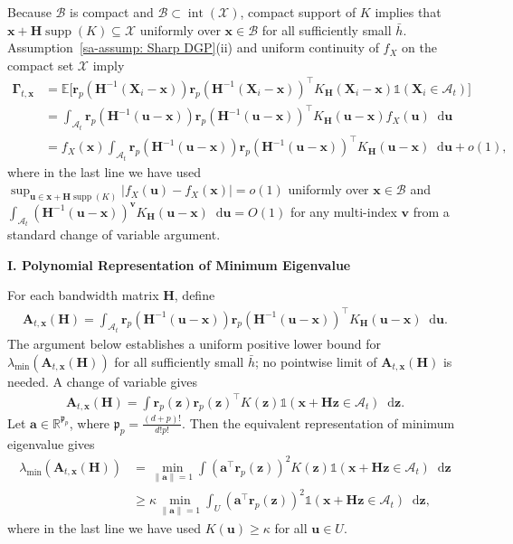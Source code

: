 \documentclass[10pt]{article}
\DeclareMathOperator{\setint}{int}
\DeclareMathOperator{\supp}{supp}
\newcommand{\E}{\mathbb{E}}
\newcommand{\Indicator}{\mathds{1}}
\newcommand{\reals}{\mathbb{R}}
\newcommand{\dif}{\mathop{}\!\mathrm{d}}
\newcommand{\norm}[1]{\left\lVert#1\right\rVert}
\newcommand{\ba}{\mathbf{a}}
\newcommand{\bA}{\mathbf{A}}
\newcommand{\bH}{\mathbf{H}}
\newcommand{\br}{\mathbf{r}}
\newcommand{\bu}{\mathbf{u}}
\newcommand{\bv}{\mathbf{v}}
\newcommand{\bx}{\mathbf{x}}
\newcommand{\bX}{\mathbf{X}}
\newcommand{\bz}{\mathbf{z}}
\newcommand{\bGamma}{\boldsymbol{\Gamma}}
\newcommand{\A}{\mathcal{A}}
\newcommand{\B}{\mathcal{B}}
\newcommand{\X}{\mathcal{X}}
\begin{document}
Because $\B$ is compact and $\B\subset\setint(\X)$, compact support of $K$ implies that $\bx+\bH\supp(K)\subseteq\X$ uniformly over $\bx\in\B$ for all sufficiently small $\bar h$. Assumption~\ref{sa-assump: Sharp DGP}(ii) and uniform continuity of $f_X$ on the compact set $\X$ imply
\begin{align*}
    \bGamma_{t,\bx} & = \E \Big[\br_p(\bH^{-1}(\bX_i-\bx)) \br_p(\bH^{-1}(\bX_i-\bx))^{\top} K_{\bH}(\bX_i - \bx) \Indicator(\bX_i \in \A_t) \Big] \\
    & = \int_{\A_t} \br_p(\bH^{-1}(\bu - \bx)) \br_p(\bH^{-1}(\bu - \bx))^{\top} K_{\bH}(\bu - \bx) f_X(\bu) \dif \bu \\
    & = f_X(\bx)\int_{\A_t} \br_p(\bH^{-1}(\bu - \bx)) \br_p(\bH^{-1}(\bu - \bx))^{\top} K_{\bH}(\bu - \bx) \dif \bu + o(1),
\end{align*}
where in the last line we have used $\sup_{\bu\in\bx+\bH\supp(K)}|f_X(\bu)-f_X(\bx)|=o(1)$ uniformly over $\bx\in\B$ and $\int_{\A_t} (\bH^{-1}(\bu - \bx))^{\bv} K_{\bH}(\bu - \bx) \dif \bu = O(1)$ for any multi-index $\bv$ from a standard change of variable argument.

\begin{center}
\textbf{I. Polynomial Representation of Minimum Eigenvalue}
\end{center}
For each bandwidth matrix $\bH$, define
\begin{align*}
    \bA_{t,\bx}(\bH) = \int_{\A_t} \br_p(\bH^{-1}(\bu - \bx)) \br_p(\bH^{-1}(\bu - \bx))^{\top} K_{\bH}(\bu - \bx) \dif \bu.
\end{align*}
The argument below establishes a uniform positive lower bound for $\lambda_{\min}(\bA_{t,\bx}(\bH))$ for all sufficiently small $\bar{h}$; no pointwise limit of $\bA_{t,\bx}(\bH)$ is needed.
A change of variable gives
\begin{align*}
    \bA_{t,\bx}(\bH) = \int \br_p(\bz) \br_p(\bz)^{\top} K(\bz) \Indicator(\bx + \bH \bz \in \A_t) \dif \bz.
\end{align*}
Let $\ba \in \reals^{\mathfrak{p}_p}$, where $\mathfrak{p}_p = \frac{(d + p)!}{d! p !}$.
Then the equivalent representation of minimum eigenvalue gives
\begin{align}\label{sa-eq: min eigenvalue}
    \nonumber \lambda_{\min}(\bA_{t,\bx}(\bH))
    & = \min_{\norm{\ba} = 1} \int (\ba^{\top} \br_p(\bz))^2 K(\bz) \Indicator(\bx + \bH \bz \in \A_t) \dif \bz \\
    & \geq \kappa \min_{\norm{\ba} = 1} \int_{U} (\ba^{\top} \br_p(\bz))^2  \Indicator(\bx + \bH \bz \in \A_t) \dif \bz,
\end{align}
where in the last line we have used $K(\bu) \geq \kappa$ for all $\bu \in U$.
\end{document}
